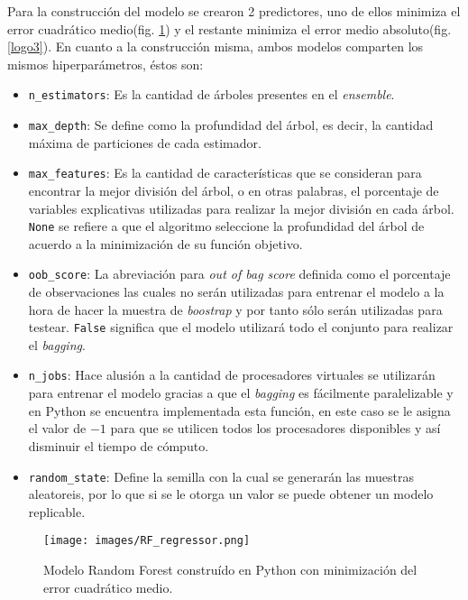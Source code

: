 Para la construcción del modelo se crearon 2 predictores, uno de ellos minimiza el error cuadrático medio(fig. \ref{logo2}) y el restante minimiza el error medio absoluto(fig. \ref{logo3}). En cuanto a la construcción misma, ambos modelos comparten los mismos hiperparámetros, 
éstos son:
\begin{itemize}
    \item \texttt{n\_estimators}: Es la cantidad de árboles presentes en el \textit{ensemble}. 
    \item \texttt{max\_depth}: Se define como la profundidad del árbol, es decir, la cantidad máxima de particiones de cada estimador.
    \item \texttt{max\_features}: Es la cantidad de características que se consideran para encontrar la mejor división del árbol, o en otras palabras, el porcentaje de variables explicativas utilizadas para realizar la mejor división en cada árbol. \texttt{None} 
    se refiere a que el algoritmo seleccione la profundidad del árbol de acuerdo a la minimización de su función objetivo.
    \item \texttt{oob\_score}: La abreviación para \textit{out of bag score} definida como el porcentaje de observaciones las cuales no serán utilizadas para entrenar el modelo a la hora de hacer la muestra de \textit{boostrap} y por tanto sólo serán utilizadas para testear.
    \texttt{False} significa que el modelo utilizará todo el conjunto para realizar el \textit{bagging}.
    \item \texttt{n\_jobs}: Hace alusión a la cantidad de procesadores virtuales se utilizarán para entrenar el modelo gracias a que el \textit{bagging} es fácilmente paralelizable y en Python se encuentra implementada esta función, en este caso se le asigna el valor de  
    $-1$ para que se utilicen todos los procesadores disponibles y así disminuir el tiempo de cómputo.
    \item \texttt{random\_state}: Define la semilla con la cual se generarán las muestras aleatoreis, por lo que si se le otorga un valor se puede obtener un modelo replicable.
\end{itemize}

\begin{figure}[H]
    \centering
          \texttt{[image: images/RF\_regressor.png]}
          \vskip -0.1in
    \caption[Construcción y entrenamiento del modelo Random Forest con criterio de \textit{mse}]{\footnotesize Modelo Random Forest construído en Python con minimización del error cuadrático medio.}
    \label{logo2}
\end{figure}

